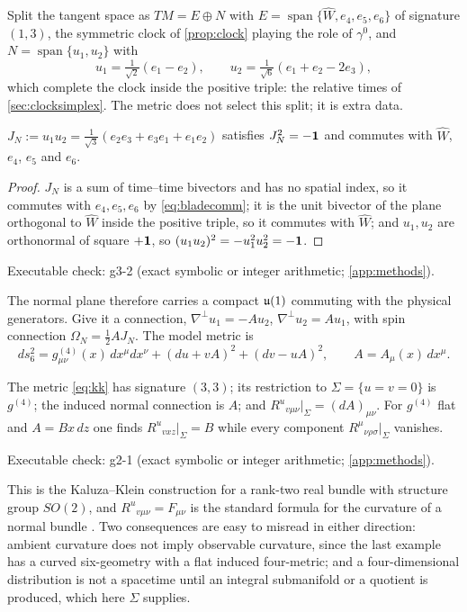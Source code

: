 Split the tangent space as $TM=E\oplus N$ with $E=\operatorname{span}\{\widehat W,e_4,e_5,e_6\}$ of signature $(1,3)$, the symmetric clock of
\cref{prop:clock} playing the role of $\gamma^0$, and $N=\operatorname{span}\{u_1,u_2\}$ with
\[
u_1=\tfrac1{\sqrt2}(e_1-e_2),\qquad u_2=\tfrac1{\sqrt6}(e_1+e_2-2e_3),
\]
which complete the clock inside the positive triple: the relative times of \cref{sec:clocksimplex}. The metric does not select this split; it is extra
data.

\begin{lemma}
\label{lem:JN}
$J_N:=u_1u_2=\tfrac1{\sqrt3}(e_2e_3+e_3e_1+e_1e_2)$ satisfies $J_N^2=-\mathbf 1$ and commutes with $\widehat W$, $e_4$, $e_5$ and $e_6$.
\end{lemma}

\begin{proof}
$J_N$ is a sum of time--time bivectors and has no spatial index, so it commutes with $e_4,e_5,e_6$ by \eqref{eq:bladecomm}; it is the unit bivector of
the plane orthogonal to $\widehat W$ inside the positive triple, so it commutes with $\widehat W$; and $u_1,u_2$ are orthonormal of square $+\mathbf 1$, so
$(u_1u_2)^2=-u_1^2u_2^2=-\mathbf 1$.
\end{proof}

\noindent Executable check: g3-2 (exact symbolic or integer arithmetic; \cref{app:methods}).

The normal plane therefore carries a compact $\mathfrak{u}(1)$ commuting with the physical generators. Give it a connection, $\nabla^\perp u_1=-Au_2$,
$\nabla^\perp u_2=Au_1$, with spin connection $\Omega_N=\tfrac12AJ_N$. The model metric is
\begin{equation}
\label{eq:kk}
ds_6^2=g^{(4)}_{\mu\nu}(x)\,dx^\mu dx^\nu+(du+vA)^2+(dv-uA)^2,\qquad A=A_\mu(x)\,dx^\mu .
\end{equation}

\begin{proposition}
\label{prop:kk}
The metric \eqref{eq:kk} has signature $(3,3)$; its restriction to $\Sigma=\{u=v=0\}$ is $g^{(4)}$; the induced normal connection is $A$; and
$R^u{}_{v\mu\nu}|_\Sigma=(dA)_{\mu\nu}$. For $g^{(4)}$ flat and $A=Bx\,dz$ one finds $R^u{}_{vxz}|_\Sigma=B$ while every component $R^\mu{}_{\nu\rho\sigma}|_\Sigma$
vanishes.
\end{proposition}

\noindent Executable check: g2-1 (exact symbolic or integer arithmetic; \cref{app:methods}).

This is the Kaluza--Klein construction for a rank-two real bundle with structure group $SO(2)$, and $R^u{}_{v\mu\nu}=F_{\mu\nu}$ is the standard formula for
the curvature of a normal bundle \cite{AppelquistChodosFreund87,ONeill83}. Two consequences are easy to misread in either direction: ambient curvature does
not imply observable curvature, since the last example has a curved six-geometry with a flat induced four-metric; and a four-dimensional distribution is not
a spacetime until an integral submanifold or a quotient is produced, which here $\Sigma$ supplies.

